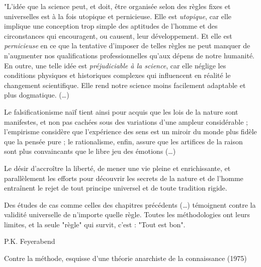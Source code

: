 \thispagestyle{preface}
\vspace{120pt}
\begin{tirade}
"L’idée que la science peut, et doit, être organisée selon des règles fixes et
universelles est à la fois utopique et pernicieuse. Elle est \emph{utopique},
car elle implique une conception trop simple des aptitudes de l’homme et des
circonstances qui encouragent, ou causent, leur développement. Et elle est
\emph{pernicieuse} en ce que la tentative d’imposer de telles règles ne peut
manquer de n’augmenter nos qualifications professionnelles qu’aux dépens de notre
humanité.
En outre, une telle idée est \emph{préjudiciable à la science}, car elle néglige
les conditions physiques et historiques complexes qui influencent en réalité le
changement scientifique. Elle rend notre science moins facilement adaptable et
plus dogmatique. (\ldots)

Le falsificationisme naïf tient ainsi pour acquis que les lois de la nature
sont manifestes, et non pas cachées sous des variations d’une ampleur
considérable ; l’empirisme considère que l’expérience des sens est un miroir du
monde plus fidèle que la pensée pure ; le rationalisme, enfin, assure que les
artifices de la raison sont plus convaincants que le libre jeu des émotions
(\ldots)

Le désir d’accroître la liberté, de mener une vie pleine et enrichissante, et
parallèlement les efforts pour découvrir les secrets de la nature et de l’homme
entraînent le rejet de tout principe universel et de toute tradition rigide.


Des études de cas comme celles des chapitres précédents (\ldots)
témoignent contre la validité universelle de n'importe quelle règle. Toutes les
méthodologies ont leurs limites, et la seule "règle" qui survit, c'est : "Tout
est bon".
\end{tirade}
\hfill P.K. Feyerabend

\hfill\footnotesize  Contre la méthode, esquisse d’une théorie anarchiste de la
 connaissance (1975)
 \normalsize
